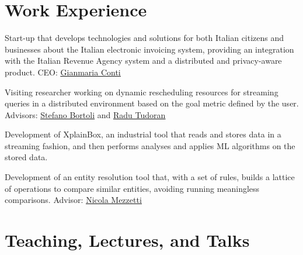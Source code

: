 \documentclass[10pt,a4paper,colorlinks,linkcolor=true]{moderncv}
\newcommand{\cvlink}[2]{\href{#1}{\ul{#2}}}
\begin{document}



\section{Work Experience}

  {Start-up that develops technologies and solutions for both Italian citizens and businesses about the Italian electronic invoicing system, providing an integration with the Italian Revenue Agency system and a distributed and privacy-aware product. CEO: \cvlink{https://www.linkedin.com/in/gianmaria-conti-38303712/}{Gianmaria Conti}}

  {Visiting researcher working on dynamic rescheduling resources for streaming queries in a distributed environment based on the goal metric defined by the user. Advisors: \cvlink{https://www.linkedin.com/in/stefano-bortoli/}{Stefano Bortoli} and \cvlink{https://www.linkedin.com/in/radu-tudoran-37545643/}{Radu Tudoran}}

  {Development of XplainBox, an industrial tool that reads and stores data in a streaming fashion, and then performs analyses and applies ML algorithms on the stored data.}

  {Development of an entity resolution tool that, with a set of rules, builds a lattice of operations to compare similar entities, avoiding running meaningless comparisons. Advisor: \cvlink{https://www.linkedin.com/in/nicolamezzetti/}{Nicola Mezzetti}}


\section{Teaching, Lectures, and Talks}
\end{document}
